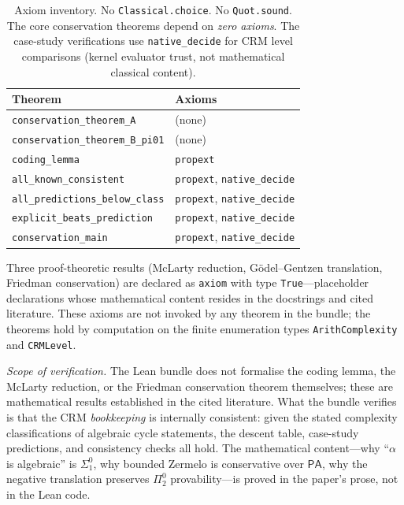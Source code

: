 \documentclass[11pt,a4paper]{article}
\theoremstyle{plain}
\theoremstyle{definition}
\newcommand{\PA}{\textsf{PA}}
\begin{document}
\begin{table}[ht]
\centering
\begin{tabular}{@{}ll@{}}
\toprule
\textbf{Theorem} & \textbf{Axioms} \\
\midrule
\texttt{conservation\_theorem\_A} & (none) \\
\texttt{conservation\_theorem\_B\_pi01} & (none) \\
\texttt{coding\_lemma} & \texttt{propext} \\
\texttt{all\_known\_consistent} & \texttt{propext}, \texttt{native\_decide} \\
\texttt{all\_predictions\_below\_class} & \texttt{propext}, \texttt{native\_decide} \\
\texttt{explicit\_beats\_prediction} & \texttt{propext}, \texttt{native\_decide} \\
\texttt{conservation\_main} & \texttt{propext}, \texttt{native\_decide} \\
\bottomrule
\end{tabular}
\caption{Axiom inventory.  No \texttt{Classical.choice}.  No \texttt{Quot.sound}.  The core conservation theorems depend on \emph{zero axioms}.  The case-study verifications use \texttt{native\_decide} for CRM level comparisons (kernel evaluator trust, not mathematical classical content).}
\label{tab:axioms}
\end{table}

Three proof-theoretic results (McLarty reduction, G\"odel--Gentzen translation, Friedman conservation) are declared as \texttt{axiom} with type \texttt{True}---placeholder declarations whose mathematical content resides in the docstrings and cited literature.  These axioms are not invoked by any theorem in the bundle; the theorems hold by computation on the finite enumeration types \texttt{ArithComplexity} and \texttt{CRMLevel}.

\emph{Scope of verification.}  The Lean bundle does not formalise the coding lemma, the McLarty reduction, or the Friedman conservation theorem themselves; these are mathematical results established in the cited literature.  What the bundle verifies is that the CRM \emph{bookkeeping} is internally consistent: given the stated complexity classifications of algebraic cycle statements, the descent table, case-study predictions, and consistency checks all hold.  The mathematical content---why ``$\alpha$ is algebraic'' is $\Sigma^0_1$, why bounded Zermelo is conservative over $\PA$, why the negative translation preserves $\Pi^0_2$ provability---is proved in the paper's prose, not in the Lean code.
\end{document}
